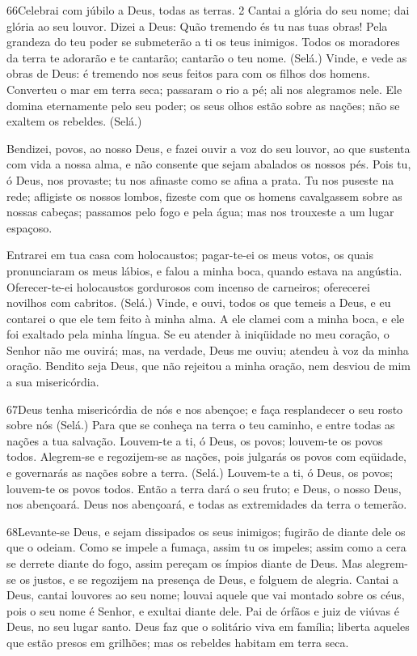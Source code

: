 \bigskip

\lettrine{66}{}Celebrai com júbilo a Deus, todas as terras. 2
Cantai a glória do seu nome; dai glória ao seu louvor. Dizei a
Deus: Quão tremendo és tu nas tuas obras! Pela grandeza do teu poder
se submeterão a ti os teus inimigos. Todos os moradores da terra
te adorarão e te cantarão; cantarão o teu nome. (Selá.) Vinde, e
vede as obras de Deus: é tremendo nos seus feitos para com os filhos
dos homens. Converteu o mar em terra seca; passaram o rio a pé;
ali nos alegramos nele. Ele domina eternamente pelo seu poder;
os seus olhos estão sobre as nações; não se exaltem os rebeldes.
(Selá.)

Bendizei, povos, ao nosso Deus, e fazei ouvir a voz do seu louvor,
ao que sustenta com vida a nossa alma, e não consente que sejam
abalados os nossos pés. Pois tu, ó Deus, nos provaste; tu nos
afinaste como se afina a prata. Tu nos puseste na rede;
afligiste os nossos lombos, fizeste com que os homens
cavalgassem sobre as nossas cabeças; passamos pelo fogo e pela água;
mas nos trouxeste a um lugar espaçoso.

Entrarei em tua casa com holocaustos; pagar-te-ei os meus votos,
os quais pronunciaram os meus lábios, e falou a minha boca,
quando estava na angústia. Oferecer-te-ei holocaustos
gordurosos com incenso de carneiros; oferecerei novilhos com
cabritos. (Selá.) Vinde, e ouvi, todos os que temeis a Deus,
e eu contarei o que ele tem feito à minha alma. A ele clamei
com a minha boca, e ele foi exaltado pela minha língua. Se eu
atender à iniqüidade no meu coração, o Senhor não me ouvirá;
mas, na verdade, Deus me ouviu; atendeu à voz da minha
oração. Bendito seja Deus, que não rejeitou a minha oração,
nem desviou de mim a sua misericórdia.

\bigskip

\lettrine{67}{}Deus tenha misericórdia de nós e nos abençoe; e
faça resplandecer o seu rosto sobre nós (Selá.) Para que se
conheça na terra o teu caminho, e entre todas as nações a tua
salvação. Louvem-te a ti, ó Deus, os povos; louvem-te os povos
todos. Alegrem-se e regozijem-se as nações, pois julgarás os
povos com eqüidade, e governarás as nações sobre a terra. (Selá.)
Louvem-te a ti, ó Deus, os povos; louvem-te os povos todos.
Então a terra dará o seu fruto; e Deus, o nosso Deus, nos
abençoará. Deus nos abençoará, e todas as extremidades da terra
o temerão.

\bigskip

\lettrine{68}{}Levante-se Deus, e sejam dissipados os seus
inimigos; fugirão de diante dele os que o odeiam. Como se impele
a fumaça, assim tu os impeles; assim como a cera se derrete diante
do fogo, assim pereçam os ímpios diante de Deus. Mas alegrem-se
os justos, e se regozijem na presença de Deus, e folguem de alegria.
Cantai a Deus, cantai louvores ao seu nome; louvai aquele que
vai montado sobre os céus, pois o seu nome é Senhor, e exultai
diante dele. Pai de órfãos e juiz de viúvas é Deus, no seu lugar
santo. Deus faz que o solitário viva em família; liberta aqueles
que estão presos em grilhões; mas os rebeldes habitam em terra seca.

